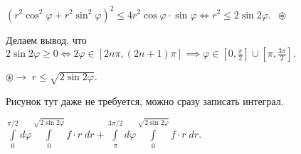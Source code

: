 \documentclass[a4paper, fleqn]{article}
\begin{document}
    $(r^2\cos^2\varphi + r^2\sin^2\varphi)^2 \leq 4 r^2 \cos \varphi \cdot \sin \varphi \iff r^2 \leq 2\sin 2\varphi. \; \; \circledast$
    
    Делаем вывод, что $2 \sin 2 \varphi \geq 0 \iff 2 \varphi \in [2n \pi, (2n + 1)\pi] \implies \varphi \in \left[0, \frac{\pi}{2}\right] \cup \left[\pi, \frac{3\pi}{2} \right].$
    
    $\circledast \to \; r \leq \sqrt{2 \sin 2 \varphi}.$ 
    
    Рисунок тут даже не требуется, можно сразу записать интеграл.
    
    $\displaystyle\int\limits_{0}^{\pi/2} d \varphi \int\limits_{0}^{\sqrt{2 \sin 2 \varphi}} f \cdot r \; d r + \int\limits_{\pi}^{3\pi/2} d \varphi \int\limits_{0}^{\sqrt{2 \sin 2 \varphi}} f \cdot r \; d r. $
    
\end{document}

